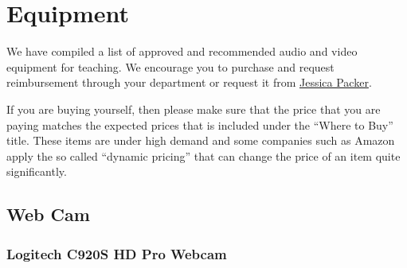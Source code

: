 \chapter{Equipment}
\label{ch:equipment}

\begin{gram}
We have compiled a list of approved and recommended audio and video
equipment for teaching.
%
We encourage you to purchase and request reimbursement through your department or request it from \href{mailto:jpacker@andrew.cmu.edu}{Jessica Packer}.
%

If you are buying yourself, then please make sure that the price that you are paying matches the expected prices that is included under the ``Where to Buy'' title.  
%
These items are under high demand and some companies such as Amazon apply the so called ``dynamic pricing'' that can change the price of an item quite significantly.
\end{gram}

\section{Web Cam}

\subsection{Logitech C920S HD Pro Webcam}

